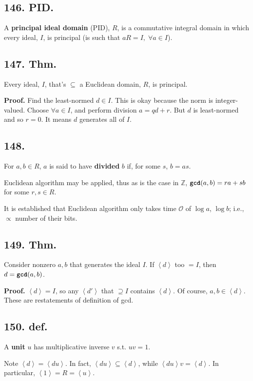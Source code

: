 \documentclass[12pt]{article}
\newcommand\Ev\forall%
\newcommand{\Ab}[1]{ \left\langle #1 \right\rangle } %
\newcommand{\BF}[1]{ \mathbb{#1} }%
\newcommand{\SF}[1]{ \mathscr{#1} }%
\newcommand{\Ss}[1]{\textsf{\bfseries{#1}}}%
\newcommand{\Tw}[1]{\texttt{\bfseries{#1}}}%
\begin{document}
\subsection*{146. PID.} A \Ss{principal ideal domain} (PID), \(R\), is a commutative integral domain in which every ideal, \(I\), is principal (is such that \(aR = I,\; \Ev a \in I\)). 

\subsection*{147. Thm.} Every ideal, \(I\), that's \(\subseteq\) a Euclidean domain, \(R\), is principal. \par
\Ss{Proof.} Find the least-normed \(d \in I\). 
This is okay because the norm is integer-valued. 
Choose \(\Ev a \in I\), and perform division \(a = qd + r\). 
But \(d\) is least-normed and so \(r =0\). 
It means \(d\) generates all of \(I\). 

\subsection*{148.} For \(a,b \in R\), \(a\) is said to have \Ss{divided} \(b\) if, for some \(s\), \(b=as\). \par
Euclidean algorithm may be applied, thus as is the case in \(\BF Z\), \(\Tw{gcd}(a,b) = ra + sb\) for some \(r,s \in R\). \par
It is established that Euclidean algorithm only takes time \(\SF O\) of \(\log a\), \(\log b\); i.e., \(\propto\) number of their bits. 

\subsection*{149. Thm.} Consider nonzero \(a,b\) that generates the ideal \(I\). 
If \(\Ab{d}\) too \(=I\), 
then \(d= \Tw{gcd}(a,b)\). \par
\Ss{Proof.} \(\Ab{d} =I\), so any \(\Ab{d'}\) that \(\supseteq I\) contains \(\Ab{d}\). 
Of course, \(a,b \in \Ab{d}\). 
These are restatements of definition of gcd. \par
[T.Y.J. --- the notation \(\Ab{r}\) (generation by operation on \(r\) and all other elements) is different with previous \(\Ab{g}\) in group theory (smallest group containing something). Text uses \((r)\), which I think is more easily confused.]

\subsection*{150. def.} A \Ss{unit} \(u\) has multiplicative inverse \(v\) s.t. \(uv=1\). \par
Note \(\Ab{d} = \Ab{du}\). 
In fact, \(\Ab{du} \subseteq \Ab{d}\), while \(\Ab{du}v = \Ab{d}\). 
In particular, \(\Ab{1} = R = \Ab{u}\). 
\end{document}
